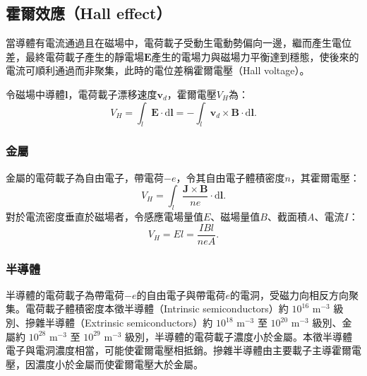 \documentclass[a4paper,12pt]{report}
\begin{document}
\begin{itemize}
\subsection{霍爾效應（Hall effect）}
當導體有電流通過且在磁場中，電荷載子受動生電動勢偏向一邊，繼而產生電位差，最終電荷載子產生的靜電場$\mathbf{E}$產生的電場力與磁場力平衡達到穩態，使後來的電流可順利通過而非聚集，此時的電位差稱霍爾電壓（Hall voltage）。

令磁場中導體$\mathbf{l}$，電荷載子漂移速度$\mathbf{v}_d$，霍爾電壓$V_H$為：
\[V_H=\int_{l}\mathbf{E}\cdot\mathrm{d}\mathbf{l}=-\int_{l}\mathbf{v}_d\times\mathbf{B}\cdot\mathrm{d}\mathbf{l}.\]
\subsubsection{金屬}
金屬的電荷載子為自由電子，帶電荷$-e$，令其自由電子體積密度$n$，其霍爾電壓：
\[V_H=\int_{l}\frac{\mathbf{J}\times\mathbf{B}}{ne}\cdot\mathrm{d}\mathbf{l}.\]
對於電流密度垂直於磁場者，令感應電場量值$E$、磁場量值$B$、截面積$A$、電流$I$：
\[V_H=E l=\frac{IB l}{neA}.\]
\subsubsection{半導體}
半導體的電荷載子為帶電荷$-e$的自由電子與帶電荷$e$的電洞，受磁力向相反方向聚集。電荷載子體積密度本徵半導體（Intrinsic semiconductors）約 $10^{16}$ m$^{-3}$ 級別、摻雜半導體（Extrinsic semiconductors）約 $10^{18}$ m$^{-3}$ 至 $10^{20}$ m$^{-3}$ 級別、金屬約 $10^{28}$ m$^{-3}$ 至 $10^{29}$ m$^{-3}$ 級別，半導體的電荷載子濃度小於金屬。本徵半導體電子與電洞濃度相當，可能使霍爾電壓相抵銷。摻雜半導體由主要載子主導霍爾電壓，因濃度小於金屬而使霍爾電壓大於金屬。

\end{itemize}
\end{document}
